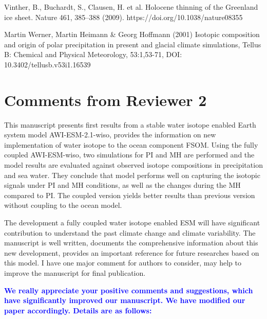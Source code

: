 \documentclass[gmd, manuscript]{copernicus}
\begin{document}
Vinther, B., Buchardt, S., Clausen, H. et al. Holocene thinning of the Greenland ice sheet. Nature 461, 385–388 (2009). https://doi.org/10.1038/nature08355

Martin Werner, Martin Heimann & Georg Hoffmann (2001) Isotopic composition and origin of polar precipitation in present and glacial climate simulations, Tellus B: Chemical and Physical Meteorology, 53:1,53-71, DOI: 10.3402/tellusb.v53i1.16539



 
 \section{Comments from Reviewer 2}
 
This manuscript presents first results from a stable water isotope enabled Earth system model AWI-ESM-2.1-wiso, provides the information on new implementation of water isotope to the ocean component FSOM. Using the fully coupled AWI-ESM-wiso, two simulations for PI and MH are performed and the model results are evaluated against observed isotope compositions in precipitation and sea water. They conclude that model performs well on capturing the isotopic signals under PI and MH conditions, as well as the changes during the MH compared to PI. The coupled version yields better results than previous version without coupling to the ocean model.
 
The development a fully coupled water isotope enabled ESM will have significant contribution to understand the past climate change and climate variability. The manuscript is well written, documents the comprehensive information about this new development, provides an important reference for future researches based on this model. I have one major comment for authors to consider, may help to improve the manuscript for final publication.

\medskip
 
 \textcolor{blue}{\textbf{We really appreciate your positive comments and suggestions, which have significantly improved our manuscript. We have modified our paper accordingly. Details are as follows: }}

\medskip
 
\end{document}
